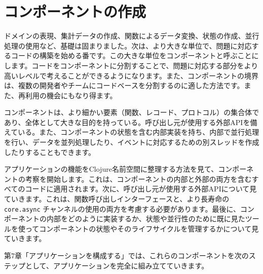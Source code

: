 \chapter{コンポーネントの作成}

ドメインの表現、集計データの作成、関数によるデータ変換、状態の作成、並行処理の使用など、基礎は固まりました。次は、より大きな単位で、問題に対応するコードの構築を始める番です。この大きな単位をコンポーネントと呼ぶことにします。コードをコンポーネントに分割することで、問題に対応する部分をより高いレベルで考えることができるようになります。また、コンポーネントの境界は、複数の開発者やチームにコードベースを分割するのに適した方法です。また、再利用の機会にもなり得ます。

コンポーネントは、より細かい要素（関数、レコード、プロトコル）の集合体であり、全体として大きな目的を持っている。呼び出し元が使用する外部APIを備えている。また、コンポーネントの状態を含む内部実装を持ち、内部で並行処理を行い、データを並列処理したり、イベントに対応するための別スレッドを作成したりすることもできます。

アプリケーションの機能をClojure名前空間に整理する方法を見て、コンポーネントの考察を開始します。これは、コンポーネントの内部と外部の両方を含むすべてのコードに適用されます。次に、呼び出し元が使用する外部APIについて見ていきます。これは、関数呼び出しインターフェースと、より長寿命の \texttt{core.async} チャンネルの使用の両方を考慮する必要があります。最後に、コンポーネントの内部をどのように実装するか、状態や並行性のために既に見たツールを使ってコンポーネントの状態やそのライフサイクルを管理するかについて見ていきます。

第7章「アプリケーションを構成する」では、これらのコンポーネントを次のステップとして、アプリケーションを完全に組み立てていきます。


